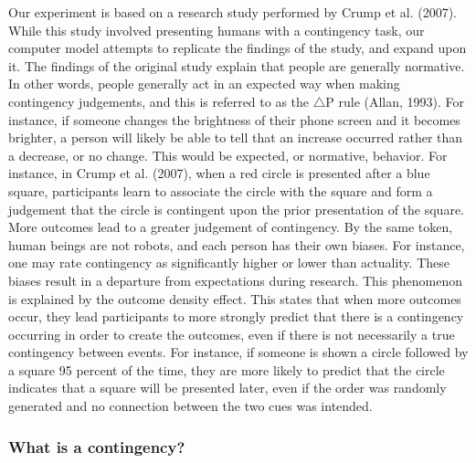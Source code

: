 \documentclass[
  english,
  man,floatsintext]{apa6}
\begin{document}
Our experiment is based on a research study performed by Crump et al. (2007). While this study involved presenting humans with a contingency task, our computer model attempts to replicate the findings of the study, and expand upon it. The findings of the original study explain that people are generally normative. In other words, people generally act in an expected way when making contingency judgements, and this is referred to as the \(\triangle\)P rule (Allan, 1993). For instance, if someone changes the brightness of their phone screen and it becomes brighter, a person will likely be able to tell that an increase occurred rather than a decrease, or no change. This would be expected, or normative, behavior. For instance, in Crump et al. (2007), when a red circle is presented after a blue square, participants learn to associate the circle with the square and form a judgement that the circle is contingent upon the prior presentation of the square. More outcomes lead to a greater judgement of contingency. By the same token, human beings are not robots, and each person has their own biases. For instance, one may rate contingency as significantly higher or lower than actuality. These biases result in a departure from expectations during research. This phenomenon is explained by the outcome density effect. This states that when more outcomes occur, they lead participants to more strongly predict that there is a contingency occurring in order to create the outcomes, even if there is not necessarily a true contingency between events. For instance, if someone is shown a circle followed by a square 95 percent of the time, they are more likely to predict that the circle indicates that a square will be presented later, even if the order was randomly generated and no connection between the two cues was intended.

\hypertarget{what-is-a-contingency}{%
\subsubsection{What is a contingency?}\label{what-is-a-contingency}}
\end{document}
